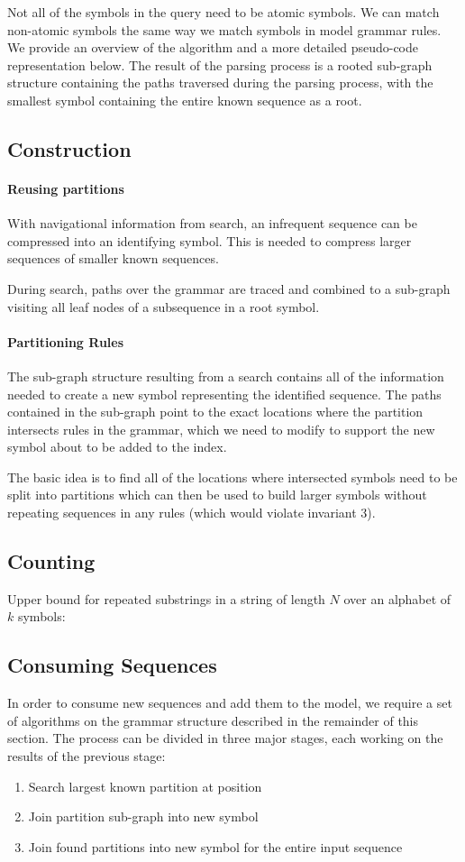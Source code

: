 Not all of the symbols in the query need to be atomic symbols. We can match non-atomic symbols the same way we match symbols in model grammar rules. We provide an overview of the algorithm and a more detailed pseudo-code representation below. The result of the parsing process is a rooted sub-graph structure containing the paths traversed during the parsing process, with the smallest symbol containing the entire known sequence as a root. 

\subsection{Construction}

\paragraph{Reusing partitions}
With navigational information from search, an infrequent sequence can be compressed into an identifying symbol. This is needed to compress larger sequences of smaller known sequences.

During search, paths over the grammar are traced and combined to a sub-graph visiting all leaf nodes of a subsequence in a root symbol.

\paragraph{Partitioning Rules}
The sub-graph structure resulting from a search contains all of the information needed to create a new symbol representing the identified sequence. The paths contained in the sub-graph point to the exact locations where the partition intersects rules in the grammar, which we need to modify to support the new symbol about to be added to the index.

The basic idea is to find all of the locations where intersected symbols need to be split into partitions which can then be used to build larger symbols without repeating sequences in any rules (which would violate invariant 3).

\subsection{Counting}
Upper bound for repeated substrings in a string of length $N$ over an alphabet of $k$ symbols:


\subsection{Consuming Sequences}
In order to consume new sequences and add them to the model, we require a set of algorithms on the grammar structure described in the remainder of this section. The process can be divided in three major stages, each working on the results of the previous stage:
\begin{enumerate}
\item Search largest known partition at position
\item Join partition sub-graph into new symbol
\item Join found partitions into new symbol for the entire input sequence
\end{enumerate}

